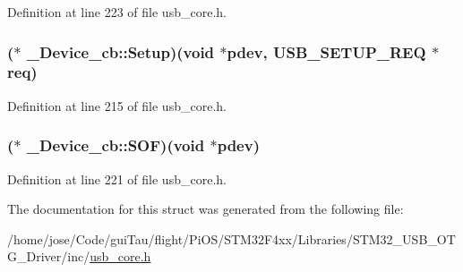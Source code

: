 Definition at line 223 of file usb\-\_\-core.\-h.

\hypertarget{struct___device__cb_ab7ffbb974bc00c175cfed7ba03c8b16b}{
\subsubsection[{Setup}]{($\ast$ \-\_\-\-Device\-\_\-cb\-::\-Setup)({\bf void} $\ast$pdev, {\bf U\-S\-B\-\_\-\-S\-E\-T\-U\-P\-\_\-\-R\-E\-Q} $\ast${\bf req})}}\label{struct___device__cb_ab7ffbb974bc00c175cfed7ba03c8b16b}


Definition at line 215 of file usb\-\_\-core.\-h.

\hypertarget{struct___device__cb_aa466062cecbfcca282201c92c6c6c644}{
\subsubsection[{S\-O\-F}]{($\ast$ \-\_\-\-Device\-\_\-cb\-::\-S\-O\-F)({\bf void} $\ast$pdev)}}\label{struct___device__cb_aa466062cecbfcca282201c92c6c6c644}


Definition at line 221 of file usb\-\_\-core.\-h.



The documentation for this struct was generated from the following file\-:\begin{DoxyCompactItemize}
\item 
/home/jose/\-Code/gui\-Tau/flight/\-Pi\-O\-S/\-S\-T\-M32\-F4xx/\-Libraries/\-S\-T\-M32\-\_\-\-U\-S\-B\-\_\-\-O\-T\-G\-\_\-\-Driver/inc/\hyperlink{_s_t_m32_f4xx_2_libraries_2_s_t_m32___u_s_b___o_t_g___driver_2inc_2usb__core_8h}{usb\-\_\-core.\-h}\end{DoxyCompactItemize}
